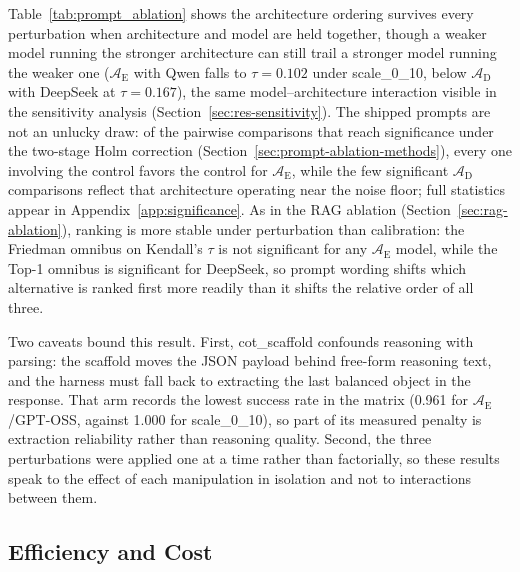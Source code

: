 \documentclass[final,3p,times]{elsarticle}
\begin{document}
Table~\ref{tab:prompt_ablation} shows the architecture ordering survives every perturbation when architecture and model are held together, though a weaker model running the stronger architecture can still trail a stronger model running the weaker one ($\mathcal{A}_{\text{E}}$ with Qwen falls to $\tau = 0.102$ under scale\_0\_10, below $\mathcal{A}_{\text{D}}$ with DeepSeek at $\tau = 0.167$), the same model--architecture interaction visible in the sensitivity analysis (Section~\ref{sec:res-sensitivity}). The shipped prompts are not an unlucky draw: of the pairwise comparisons that reach significance under the two-stage Holm correction (Section~\ref{sec:prompt-ablation-methods}), every one involving the control favors the control for $\mathcal{A}_{\text{E}}$, while the few significant $\mathcal{A}_{\text{D}}$ comparisons reflect that architecture operating near the noise floor; full statistics appear in Appendix~\ref{app:significance}. As in the RAG ablation (Section~\ref{sec:rag-ablation}), ranking is more stable under perturbation than calibration: the Friedman omnibus on Kendall's $\tau$ is not significant for any $\mathcal{A}_{\text{E}}$ model, while the Top-1 omnibus is significant for DeepSeek, so prompt wording shifts which alternative is ranked first more readily than it shifts the relative order of all three.

Two caveats bound this result. First, cot\_scaffold confounds reasoning with parsing: the scaffold moves the JSON payload behind free-form reasoning text, and the harness must fall back to extracting the last balanced object in the response. That arm records the lowest success rate in the matrix (0.961 for $\mathcal{A}_{\text{E}}$/GPT-OSS, against 1.000 for scale\_0\_10), so part of its measured penalty is extraction reliability rather than reasoning quality. Second, the three perturbations were applied one at a time rather than factorially, so these results speak to the effect of each manipulation in isolation and not to interactions between them.

\FloatBarrier
\subsection{Efficiency and Cost}
\label{sec:res-efficiency}
\end{document}
